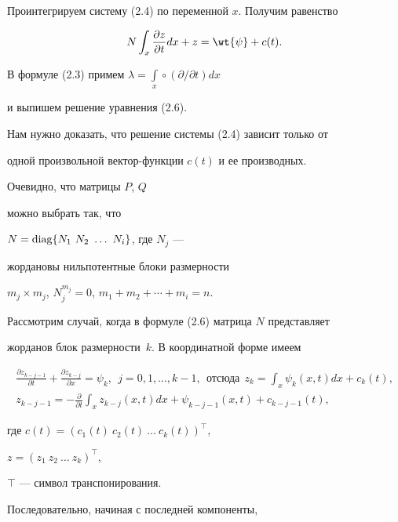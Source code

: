 \begin{pf}


Проинтегрируем систему (2.4) по переменной $x$. Получим равенство


\begin{equation}


N\int_{x}\frac{\partial z}{\partial t}dx+z=\wt {\psi }+c(t).


\end{equation}


В формуле (2.3) примем $\lambda = \int\limits_x\circ (\partial /\partial t)dx$


и выпишем решение уравнения (2.6).


Нам нужно доказать, что решение системы (2.4) зависит только от


одной произвольной вектор-функции $c(t)$ и ее производных.


Очевидно, что матрицы $P$, $Q$


можно выбрать так, что


$N = \diag \{N_{1}\ N_{2}\ \dotsc\ N_{i}\}$, где $N_{j}$ ---


жордановы нильпотентные блоки размерности


$m_j\times m_j$, $N_{j}^{m_j}=0$, $m_1+ m_2+\dotsb +m_i = n$.


Рассмотрим случай, когда в формуле (2.6) матрица $N$ представляет


жорданов блок размерности~$k$. В координатной форме имеем


\begin{gather*}


\frac{\partial z_{k-j-1}}{\partial t}+


\frac{\partial z_{k-j}}{\partial x}=\psi _k,\ \ j=0,1,\dotsc, k-1,


\ \ \text{отсюда} \ \ 


z_k=\int _x\psi _{k}(x,t)dx+c_{k}(t),\\ 


z_{k-j-1}=-\frac{\partial }{\partial t}\int _x


z_{k-j}(x,t)dx+\psi _{k-j-1}(x,t)+c_{k-j-1}(t),


\end{gather*}


где $c(t)=\left(c_{1}(t)\ c_{2}(t)\ \dotsc\ c_{k}(t)\right)^{\top }$,


$z=\left(z_{1}\ z_{2}\ \dotsc\ z_{k}\right)^{\top }$,


$\top$ --- символ транспонирования.


Последовательно, начиная с последней компоненты,



\end{pf}
